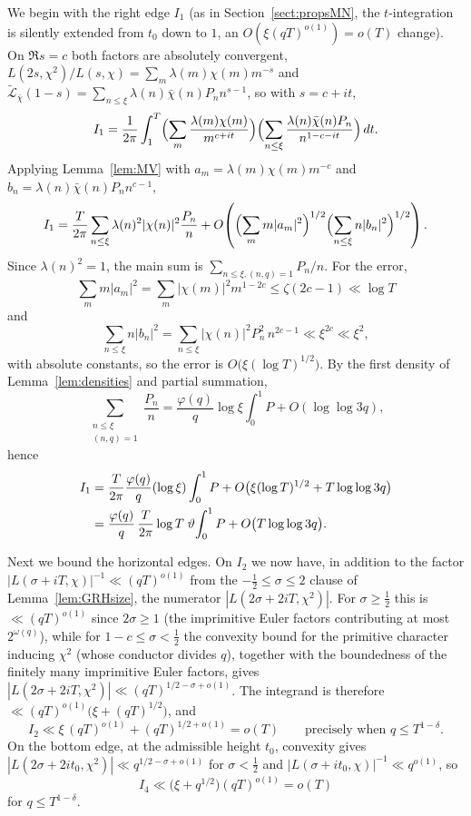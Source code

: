 \documentclass[12pt,a4paper,reqno]{amsart}
\theoremstyle{remark}
\numberwithin{equation}{section}
\begin{document}
We begin with the right edge $I_1$ (as in Section~\ref{sect:propsMN}, the $t$-integration is silently extended from $t_0$ down to $1$, an $O(\xi(qT)^{o(1)})=o(T)$ change). On $\Re s=c$ both factors are absolutely convergent, $L(2s,\chi^2)/L(s,\chi)=\sum_m\lambda(m)\chi(m)m^{-s}$ and $\widetilde{\mathcal{L}}_{\bar\chi}(1-s)=\sum_{n\le\xi}\lambda(n)\bar\chi(n)P_n n^{s-1}$, so with $s=c+it$,
\[
I_1=\frac{1}{2\pi}\int_1^T\Bigl(\sum_m\frac{\lambda(m)\chi(m)}{m^{c+it}}\Bigr)\Bigl(\sum_{n\le\xi}\frac{\lambda(n)\bar\chi(n)P_n}{n^{1-c-it}}\Bigr)\,dt.
\]
Applying Lemma~\ref{lem:MV} with $a_m=\lambda(m)\chi(m)m^{-c}$ and $b_n=\lambda(n)\bar\chi(n)P_n n^{c-1}$,
\[
I_1=\frac{T}{2\pi}\sum_{n\le\xi}\lambda(n)^2|\chi(n)|^2\frac{P_n}{n}+O\!\left(\Bigl(\sum_m m|a_m|^2\Bigr)^{1/2}\Bigl(\sum_{n\le\xi}n|b_n|^2\Bigr)^{1/2}\right).
\]
Since $\lambda(n)^2=1$, the main sum is $\sum_{n\le\xi,(n,q)=1}P_n/n$. For the error,
\[
\sum_m m|a_m|^2=\sum_m|\chi(m)|^2 m^{1-2c}\le\zeta(2c-1)\ll\log T
\]
and
\[
\sum_{n\le\xi}n|b_n|^2=\sum_{n\le\xi}|\chi(n)|^2P_n^2\,n^{2c-1}\ll\xi^{2c}\ll\xi^2,
\]
with absolute constants, so the error is $O\bigl(\xi(\log T)^{1/2}\bigr)$. By the first density of Lemma~\ref{lem:densities} and partial summation,
\[
\sum_{\substack{n\le\xi\\(n,q)=1}}\frac{P_n}{n}=\frac{\varphi(q)}{q}\log\xi\int_0^1 P+O(\log\log 3q),
\]
hence
\begin{align}
I_1&=\frac{T}{2\pi}\frac{\varphi(q)}{q}(\log\xi)\int_0^1 P+O\bigl(\xi(\log T)^{1/2}+T\log\log 3q\bigr)\notag\\
&=\frac{\varphi(q)}{q}\,\frac{T}{2\pi}\log T\;\vartheta\!\int_0^1 P+O\bigl(T\log\log 3q\bigr).\label{eq:I1-Ng}
\end{align}

Next we bound the horizontal edges. On $I_2$ we now have, in addition to the factor $|L(\sigma+iT,\chi)|^{-1}\ll(qT)^{o(1)}$ from the $-\tfrac12\le\sigma\le2$ clause of Lemma~\ref{lem:GRHsize}, the numerator $|L(2\sigma+2iT,\chi^2)|$. For $\sigma\ge\tfrac12$ this is $\ll(qT)^{o(1)}$ since $2\sigma\ge1$ (the imprimitive Euler factors contributing at most $2^{\omega(q)}$), while for $1-c\le\sigma<\tfrac12$ the convexity bound for the primitive character inducing $\chi^2$ (whose conductor divides $q$), together with the boundedness of the finitely many imprimitive Euler factors, gives $|L(2\sigma+2iT,\chi^2)|\ll(qT)^{1/2-\sigma+o(1)}$. The integrand is therefore $\ll(qT)^{o(1)}\bigl(\xi+(qT)^{1/2}\bigr)$, and
\[
I_2\ll \xi\,(qT)^{o(1)}+(qT)^{1/2+o(1)}=o(T)
\qquad\text{precisely when }q\le T^{1-\delta}.
\]
On the bottom edge, at the admissible height $t_0$, convexity gives $|L(2\sigma+2it_0,\chi^2)|\ll q^{1/2-\sigma+o(1)}$ for $\sigma<\tfrac12$ and $|L(\sigma+it_0,\chi)|^{-1}\ll q^{o(1)}$, so
\[
I_4\ll\bigl(\xi+q^{1/2}\bigr)(qT)^{o(1)}=o(T)
\]
for $q\le T^{1-\delta}$.
\end{document}
